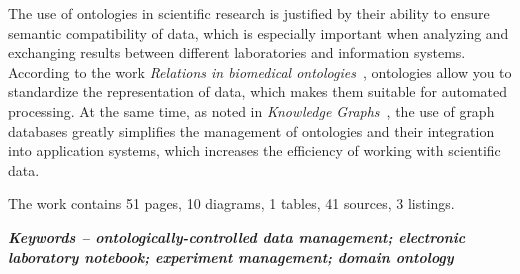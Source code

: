 The use of ontologies in scientific research is justified by their ability to ensure semantic compatibility of data, which is especially important when analyzing and exchanging results between different laboratories and information systems. According to the work \textit{Relations in biomedical ontologies}~\cite{ontology:base1}, ontologies allow you to standardize the representation of data, which makes them suitable for automated processing. At the same time, as noted in \textit{Knowledge Graphs}~\cite{ontology:base2}, the use of graph databases greatly simplifies the management of ontologies and their integration into application systems, which increases the efficiency of working with scientific data.

The work contains 51 pages, 10 diagrams, 1 tables, 41 sources, 3 listings.

\textit{\textbf{Keywords -- ontologically-controlled data management; electronic laboratory notebook; experiment management; domain ontology}}
